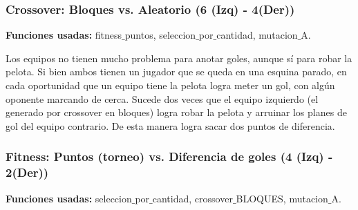 
\subsubsection*{Crossover: Bloques vs. Aleatorio (6 (Izq) - 4(Der))}

\textbf{Funciones usadas: } fitness$\_$puntos, seleccion$\_$por$\_$cantidad, mutacion$\_$A.






Los equipos no tienen mucho problema para anotar goles, aunque sí para robar la pelota.
Si bien ambos tienen un jugador que se queda en una esquina parado, en cada oportunidad que un equipo tiene la pelota logra meter un gol, con algún oponente marcando de cerca.
Sucede dos veces que el equipo izquierdo (el generado por crossover en bloques) logra robar la pelota y arruinar los planes de gol del equipo contrario. De esta manera logra sacar dos puntos de diferencia.


\subsubsection*{Fitness: Puntos (torneo) vs. Diferencia de goles (4 (Izq) - 2(Der))}

\textbf{Funciones usadas: } seleccion$\_$por$\_$cantidad, crossover$\_$BLOQUES, mutacion$\_$A.


